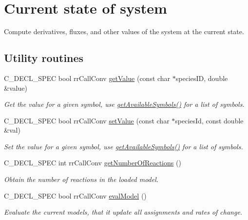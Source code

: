 \hypertarget{group__state}{
\section{\-Current state of system}
\label{group__state}
}


\-Compute derivatives, fluxes, and other values of the system at the current state.  


\subsection*{\-Utility routines}
\begin{DoxyCompactItemize}
\item 
\-C\-\_\-\-D\-E\-C\-L\-\_\-\-S\-P\-E\-C bool rr\-Call\-Conv \hyperlink{group__utility_ga8c67bc930b33926bccb3c9f810dc2825}{get\-Value} (const char $\ast$species\-I\-D, double \&value)
\begin{DoxyCompactList}\small\item\em \-Get the value for a given symbol, use \hyperlink{group__state_gaa06a430f57d4df400e58fd954766901c}{get\-Available\-Symbols()} for a list of symbols. \end{DoxyCompactList}\item 
\-C\-\_\-\-D\-E\-C\-L\-\_\-\-S\-P\-E\-C bool rr\-Call\-Conv \hyperlink{group__utility_ga8663bcca2b00ef20c13841ca9fc9f56c}{set\-Value} (const char $\ast$species\-Id, const double \&val)
\begin{DoxyCompactList}\small\item\em \-Set the value for a given symbol, use \hyperlink{group__state_gaa06a430f57d4df400e58fd954766901c}{get\-Available\-Symbols()} for a list of symbols. \end{DoxyCompactList}\item 
\-C\-\_\-\-D\-E\-C\-L\-\_\-\-S\-P\-E\-C int rr\-Call\-Conv \hyperlink{group__utility_gae25399f84ff2d1fda619358a1af9a1b5}{get\-Number\-Of\-Reactions} ()
\begin{DoxyCompactList}\small\item\em \-Obtain the number of reactions in the loaded model. \end{DoxyCompactList}\item 
\-C\-\_\-\-D\-E\-C\-L\-\_\-\-S\-P\-E\-C bool rr\-Call\-Conv \hyperlink{group__utility_ga3fbb7c2fab261f25a3871f1caf398ff1}{eval\-Model} ()
\begin{DoxyCompactList}\small\item\em \-Evaluate the current models, that it update all assignments and rates of change. \end{DoxyCompactList}\item 

\end{DoxyCompactItemize}
